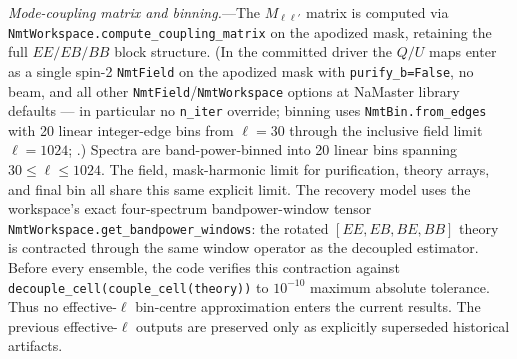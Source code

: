 \documentclass[aps,prd,twocolumn,superscriptaddress,showpacs,preprintnumbers,nofootinbib,longbibliography,floatfix]{revtex4-2}
\begin{document}
\emph{Mode-coupling matrix and binning.}---The $M_{\ell\ell'}$ matrix is
computed via
\texttt{NmtWorkspace.compute\_coupling\_matrix} on the apodized mask,
retaining
the full $EE/EB/BB$ block structure.
(In the committed driver the $Q/U$ maps enter as a single spin-2
\texttt{NmtField} on the apodized mask with \texttt{purify\_b=False}, no
beam, and all other \texttt{NmtField}/\texttt{NmtWorkspace} options at
NaMaster library defaults --- in particular no \texttt{n\_iter} override;
binning uses \texttt{NmtBin.from\_edges} with 20 linear integer-edge bins
from $\ell=30$ through the inclusive field limit $\ell=1024$;
.) Spectra are band-power-binned into
20 linear bins spanning $30 \le \ell \le 1024$. The field, mask-harmonic
limit for purification, theory arrays, and final bin all share this same
explicit limit. The recovery model uses
the workspace's exact four-spectrum bandpower-window tensor
\texttt{NmtWorkspace.get\_bandpower\_windows}: the rotated
$[EE,EB,BE,BB]$ theory is contracted through the same window operator as
the decoupled estimator. Before every ensemble, the code verifies this
contraction against \texttt{decouple\_cell(couple\_cell(theory))} to
$10^{-10}$ maximum absolute tolerance. Thus no effective-$\ell$ bin-centre
approximation enters the current results. The previous effective-$\ell$
outputs are preserved only as explicitly superseded historical artifacts.
\end{document}
